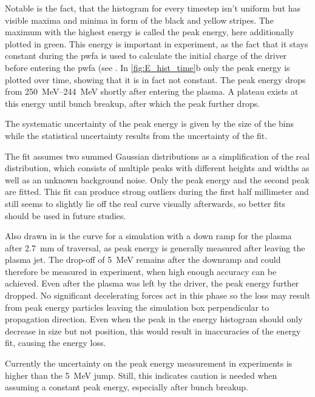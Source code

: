 \documentclass[bachelor_thesis]{subfiles}
\begin{document}
Notable is the fact, that the histogram for every timestep isn't uniform but has visible maxima and minima in form of the black and yellow stripes. The maximum with the highest energy is called the peak energy, here additionally plotted in green.
This energy is important in experiment, as the fact that it stays constant during the \gls{pwfa} is used to calculate the initial charge of the driver before entering the \gls{pwfa} (see \cite{Schoebel2022}.
In \autoref{fig:E_hist_time}b only the peak energy is plotted over time, showing that it is in fact not constant. The peak energy drops from \qtyrange{250}{244}{\MeV} shortly after entering the plasma.
A plateau exists at this energy until bunch breakup, after which the peak further drops.

The systematic uncertainty of the peak energy is given by the size of the bins while the statistical uncertainty results from the uncertainty of the fit. 

The fit assumes two summed Gaussian distributions as a simplification of the real distribution, which consists of multiple peaks with different heights and widths as well as an unknown background noise. Only the peak energy and the second peak are fitted.
This fit can produce strong outliers during the first half millimeter and still seems to slightly lie off the real curve visually afterwards, so better fits should be used in future studies.

Also drawn in is the curve for a simulation with a down ramp for the plasma after \qty{2.7}{\mm} of traversal, as peak energy is generally measured after leaving the plasma jet. The drop-off of \qty{5}{\MeV} remains after 
the downramp and could therefore be measured in experiment, when high enough accuracy can be achieved. Even after the plasma was left by the driver, the peak energy further dropped. No significant decelerating forces act in this phase so the loss may result
from peak energy particles leaving the simulation box perpendicular to propagation direction. Even when the peak in the energy histogram should only decrease in size but not position, this would result in inaccuracies of the energy fit,
causing the energy loss.

Currently the uncertainty on the peak energy measurement in experiments is higher than the \qty{5}{\MeV} jump. Still, this indicates caution is needed when assuming a constant peak energy, especially after bunch breakup.
\end{document}
